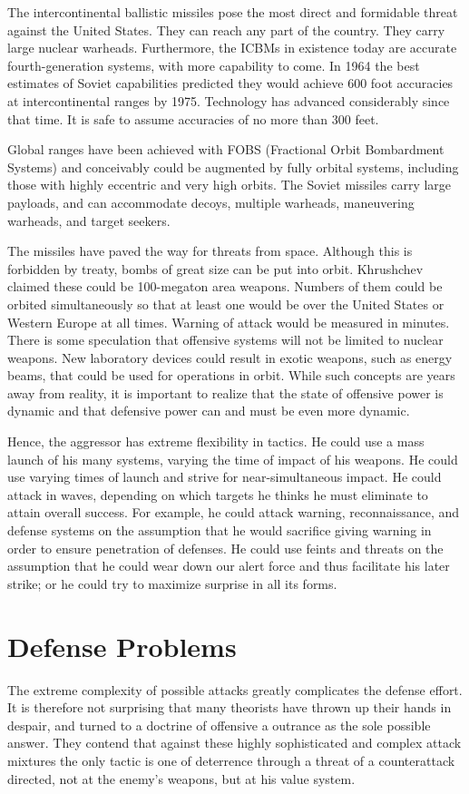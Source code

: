 The intercontinental ballistic missiles pose the most direct and formidable threat against the United States. They can reach any part of the country. They carry large nuclear warheads. Furthermore, the ICBMs in existence today are accurate fourth-generation systems, with more capability to come. In 1964 the best estimates of Soviet capabilities predicted they would achieve 600 foot accuracies at intercontinental ranges by 1975. Technology has advanced considerably since that time. It is safe to assume accuracies of no more than 300 feet.

Global ranges have been achieved with FOBS (Fractional Orbit Bombardment Systems) and conceivably could be augmented by fully orbital systems, including those with highly eccentric and very high orbits. The Soviet missiles carry large payloads, and can accommodate decoys, multiple warheads, maneuvering warheads, and target seekers.

The missiles have paved the way for threats from space. Although this is forbidden by treaty, bombs of great size can be put into orbit. Khrushchev claimed these could be 100-megaton area weapons. Numbers of them could be orbited simultaneously so that at least one would be over the United States or Western Europe at all times. Warning of attack would be measured in minutes. There is some speculation that offensive systems will not be limited to nuclear weapons. New laboratory devices could result in exotic weapons, such as energy beams, that could be used for operations in orbit. While such concepts are years away from reality, it is important to realize that the state of offensive power is dynamic and that defensive power can and must be even more dynamic.

Hence, the aggressor has extreme flexibility in tactics. He could use a mass launch of his many systems, varying the time of impact of his weapons. He could use varying times of launch and strive for near-simultaneous impact. He could attack in waves, depending on which targets he thinks he must eliminate to attain overall success. For example, he could attack warning, reconnaissance, and defense systems on the assumption that he would sacrifice giving warning in order to ensure penetration of defenses. He could use feints and threats on the assumption that he could wear down our alert force and thus facilitate his later strike; or he could try to maximize surprise in all its forms.

\section{Defense Problems}
The extreme complexity of possible attacks greatly complicates the defense effort. It is therefore not surprising that many theorists have thrown up their hands in despair, and turned to a doctrine of offensive a outrance as the sole possible answer. They contend that against these highly sophisticated and complex attack mixtures the only tactic is one of deterrence through a threat of a counterattack directed, not at the enemy's weapons, but at his value system.

